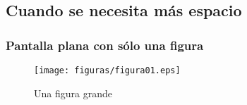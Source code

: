 \documentclass{beamer}
\begin{document}
\subsection{Cuando se necesita más espacio} 
\begin{frame}[plain]
\frametitle{Pantalla plana con sólo una figura}
\begin{figure}
\texttt{[image: figuras/figura01.eps]} 
\caption{Una figura grande}
\end{figure}
\end{frame}
\fi
\end{document}

